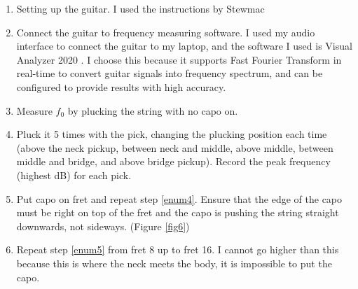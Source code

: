\begin{enumerate}
    \item Setting up the guitar. I used the instructions by Stewmac \cite{stewmac}
    \item Connect the guitar to frequency measuring software. I used my audio interface to connect the guitar to my laptop, and the software I used is Visual Analyzer 2020 \cite{va20}. I choose this because it supports Fast Fourier Transform in real-time to convert guitar signals into frequency spectrum, and can be configured to provide results with high accuracy. 
    \item Measure $f_0$ by plucking the string with no capo on.
    \item Pluck it 5 times with the pick, changing the plucking position each time (above the neck pickup, between neck and middle, above middle, between middle and bridge, and above bridge pickup). Record the peak frequency (highest dB) for each pick. \label{enum4}
    \item Put capo on  fret and repeat step \ref{enum4}. Ensure that the edge of the capo must be right on top of the fret and the capo is pushing the string straight downwards, not sideways. (Figure \ref{fig6})\label{enum5}
    \item Repeat step \ref{enum5} from fret 8 up to fret 16. I cannot go higher than this because this is where the neck meets the body, it is impossible to put the capo.
\end{enumerate}
\newpage